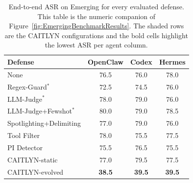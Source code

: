 \begin{table}[htbp!]
  \centering
  \scriptsize
  \setlength{\tabcolsep}{4pt}
  \renewcommand{\arraystretch}{1.18}
  \caption[End-to-end ASR on Emerging for every evaluated defense.]{%
    End-to-end ASR on Emerging for every evaluated defense.
    This table is the numeric companion of
    Figure~\ref{fig:EmergingBenchmarkResults}.
    The shaded rows are the CAITLYN configurations and the
    bold cells highlight the lowest ASR per agent column.
  }
  \label{tab:appendix-emerging-full}
  \begin{tabular}{@{}lccc@{}}
    \toprule
    \textbf{Defense} & \textbf{OpenClaw} & \textbf{Codex} & \textbf{Hermes} \\
    \midrule
    None                           & 76.5 & 76.0 & 78.0 \\
    Regex-Guard$^{*}$              & 72.5 & 74.5 & 76.0 \\
    LLM-Judge$^{*}$                & 78.0 & 79.0 & 76.0 \\
    LLM-Judge+Fewshot$^{*}$        & 80.0 & 79.0 & 78.5 \\
    Spotlighting+Delimiting        & 77.0 & 79.0 & 76.0 \\
    Tool Filter                    & 78.0 & 75.5 & 77.5 \\
    PI Detector                    & 75.5 & 76.5 & 75.5 \\
    CAITLYN-static                 & 77.0 & 79.5 & 77.5 \\
    CAITLYN-evolved                & \textbf{38.5} & \textbf{39.5} & \textbf{39.5} \\
    \bottomrule
  \end{tabular}
\end{table}